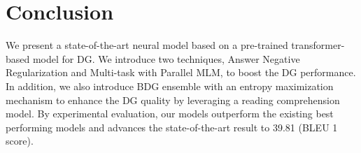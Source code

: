 \documentclass[11pt,a4paper]{article}
\begin{document}
\begin{table*}[t]
\centering
{}
\caption{An Overview of the Existing DG works}
\label{tab:rel2}
\end{table*} \section{Conclusion}\label{sec:conclusion}
We present a state-of-the-art neural model based on a pre-trained transformer-based model for DG. We introduce two techniques, Answer Negative Regularization and Multi-task with Parallel MLM, to boost the DG performance. In addition, we also introduce BDG ensemble with an entropy maximization mechanism to enhance the DG quality by leveraging a reading comprehension model. By experimental evaluation, our models outperform the existing best performing models and advances the state-of-the-art result to 39.81 (BLEU 1 score).
\end{document}
